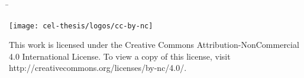 \vspace{2cm}
\begin{tabbing}
\hspace{3em}\= \kill
\>\theThesisAuthor\\[1ex]
\end{tabbing}

\fi

\ifx\theThesisCC\dictThesisTRUE
\newpage
\begin{center}
 \texttt{[image: cel-thesis/logos/cc-by-nc]}
\end{center}

\vspace{1cm}
This work is licensed under the Creative Commons Attribution-NonCommercial 4.0 International License. To view a copy of this license, visit http://creativecommons.org/licenses/by-nc/4.0/.
\fi
